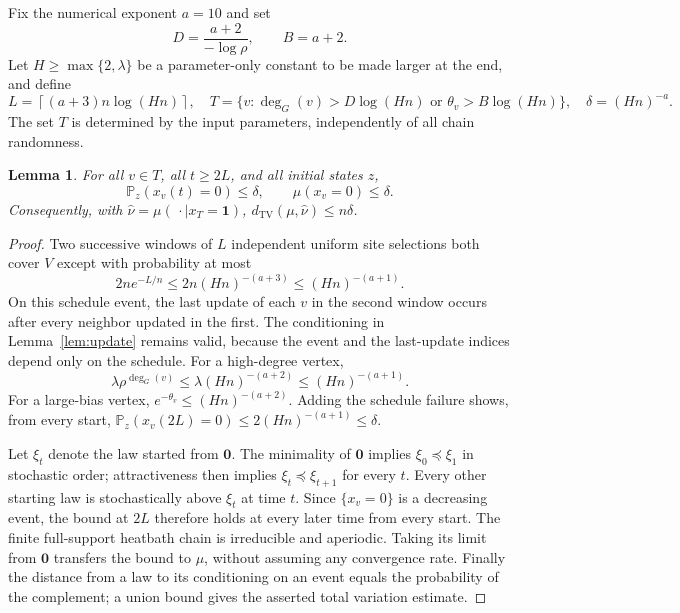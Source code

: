 \documentclass[11pt]{article}
\newtheorem{lemma}[theorem]{Lemma}
\theoremstyle{remark}\newtheorem{remark}[theorem]{Remark}
\newcommand{\TV}{d_{\mathrm{TV}}}
\newcommand{\Prob}{\mathbb P}
\newcommand{\one}{\mathbf 1}
\newcommand{\zero}{\mathbf 0}
\begin{document}
Fix the numerical exponent $a=10$ and set
\begin{equation}\label{eq:DB}
 D=\frac{a+2}{-\log\rho},\qquad B=a+2.
\end{equation}
Let $H\geq\max\{2,\lambda\}$ be a parameter-only constant to be made
larger at the end, and define
\begin{equation}\label{eq:trim}
 L=\left\lceil(a+3)n\log(Hn)\right\rceil,\quad
 T=\{v:\deg_G(v)>D\log(Hn)\text{ or }\theta_v>B\log(Hn)\},
 \quad \delta=(Hn)^{-a}.
\end{equation}
The set $T$ is determined by the input parameters, independently of all
chain randomness.

\begin{lemma}\label{lem:burn}
For all $v\in T$, all $t\geq2L$, and all initial states $z$,
\[
 \Prob_z(x_v(t)=0)\leq\delta,
 \qquad \mu(x_v=0)\leq\delta.
\]
Consequently, with $\widehat\nu=\mu(\,\cdot\mid x_T=\one)$,
$\TV(\mu,\widehat\nu)\leq n\delta$.
\end{lemma}
\begin{proof}
Two successive windows of $L$ independent uniform site selections both
cover $V$ except with probability at most
\[
 2n e^{-L/n}\leq2n(Hn)^{-(a+3)}\leq(Hn)^{-(a+1)}.
\]
On this schedule event, the last update of each $v$ in the second window
occurs after every neighbor updated in the first. The conditioning in
Lemma~\ref{lem:update} remains valid, because the event and the last-update
indices depend only on the schedule. For a high-degree vertex,
\[
 \lambda\rho^{\deg_G(v)}\leq\lambda(Hn)^{-(a+2)}
 \leq(Hn)^{-(a+1)}.
\]
For a large-bias vertex, $e^{-\theta_v}\leq(Hn)^{-(a+2)}$.
Adding the schedule failure shows, from every start,
$\Prob_z(x_v(2L)=0)\leq2(Hn)^{-(a+1)}\leq\delta$.

Let $\xi_t$ denote the law started from $\zero$. The minimality of
$\zero$ implies $\xi_0\preceq\xi_1$ in stochastic order; attractiveness
then implies $\xi_t\preceq\xi_{t+1}$ for every $t$. Every other starting
law is stochastically above $\xi_t$ at time $t$. Since $\{x_v=0\}$ is a
decreasing event, the bound at $2L$ therefore holds at every later time
from every start. The finite full-support heatbath chain is irreducible
and aperiodic. Taking its limit from $\zero$ transfers the bound to $\mu$,
without assuming any convergence rate. Finally the distance from a law
to its conditioning on an event equals the probability of the complement;
a union bound gives the asserted total variation estimate.
\end{proof}
\end{document}
